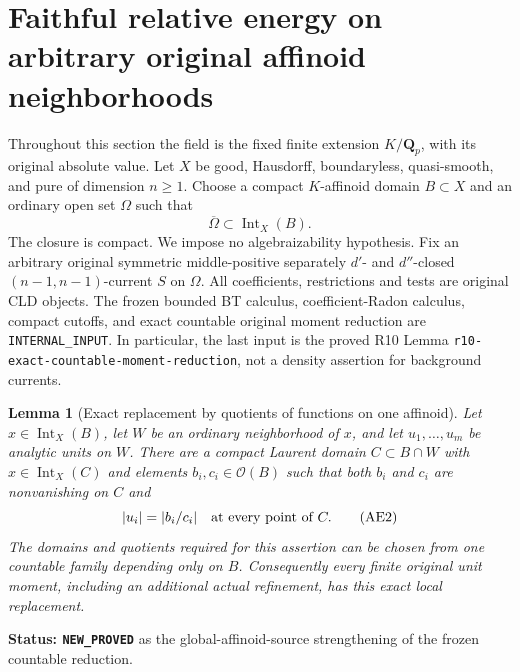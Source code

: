 \documentclass[11pt,a4paper]{article}
\numberwithin{equation}{section}
\newtheorem{lemma}[theorem]{Lemma}
\theoremstyle{definition}
\theoremstyle{remark}
\begin{document}
\section{Faithful relative energy on arbitrary original affinoid neighborhoods}
\label{sec:r11-affinoid-energy}

Throughout this section the field is the fixed finite extension
$K/\mathbf Q_p$, with its original absolute value.  Let $X$ be good,
Hausdorff, boundaryless, quasi-smooth, and pure of dimension $n\geq1$.
Choose a compact $K$-affinoid domain $B\subset X$ and an ordinary open
set $\Omega$ such that
\[
                 \overline\Omega\subset\operatorname{Int}_X(B).
 \tag{AE1}
\]
The closure is compact.  We impose no algebraizability hypothesis.
Fix an arbitrary original symmetric middle-positive separately
$d'$- and $d''$-closed $(n-1,n-1)$-current $S$ on $\Omega$.
All coefficients, restrictions and tests are original CLD objects.
The frozen bounded BT calculus, coefficient-Radon calculus, compact
cutoffs, and exact countable original moment reduction are
\texttt{INTERNAL\_INPUT}.  In particular, the last input is the
proved R10 Lemma \texttt{r10-exact-countable-moment-reduction},
not a density assertion for background currents.

\begin{lemma}[Exact replacement by quotients of functions on one affinoid]
\label{lem:r11-affinoid-rational-unit-replacement}
Let $x\in\operatorname{Int}_X(B)$, let $W$ be an ordinary neighborhood
of $x$, and let $u_1,\ldots,u_m$ be analytic units on $W$.
There are a compact Laurent domain $C\subset B\cap W$ with
$x\in\operatorname{Int}_X(C)$ and elements
$b_i,c_i\in\mathcal O(B)$ such that both $b_i$ and $c_i$ are
nonvanishing on $C$ and
\[
              |u_i|=|b_i/c_i|\quad\hbox{at every point of }C.
 \tag{AE2}
\]
The domains and quotients required for this assertion can be chosen
from one countable family depending only on $B$.
Consequently every finite original unit moment, including an
additional actual refinement, has this exact local replacement.
\end{lemma}

\noindent\textbf{Status: \texttt{NEW\_PROVED}} as the
global-affinoid-source strengthening of the frozen countable reduction.
\end{document}
